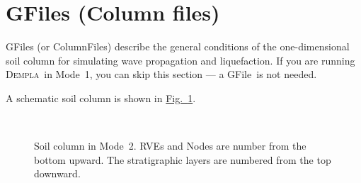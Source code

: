 \documentclass[letterpaper,11pt]{article}
\newcommand{\Dempla}{\textsc{Dempla}}
\newcommand{\ColumnFile}{\textsf{ColumnFile}}
\newcommand{\GFile}{\textsf{GFile}}
\begin{document}
\section{GFiles (Column files)}\label{sec:GFiles}
%
\GFile s (or \ColumnFile s) describe the general conditions of the
one-dimensional soil column for simulating wave propagation
and liquefaction.
If you are running \Dempla\ in Mode~1,
you can skip this section --- a \GFile\ is not needed.
%
\par
A schematic soil column is shown in
\hyperref[fig:column]{Fig.~\ref*{fig:column}}.
%
\begin{figure}
  \centering
  \mbox{%
    \quad\quad
  }
  \caption{Soil column in Mode~2.  RVEs and Nodes
           are number from the bottom upward.
           The stratigraphic layers are numbered
           from the top downward.}
  \label{fig:column}
\end{figure}
\end{document}
